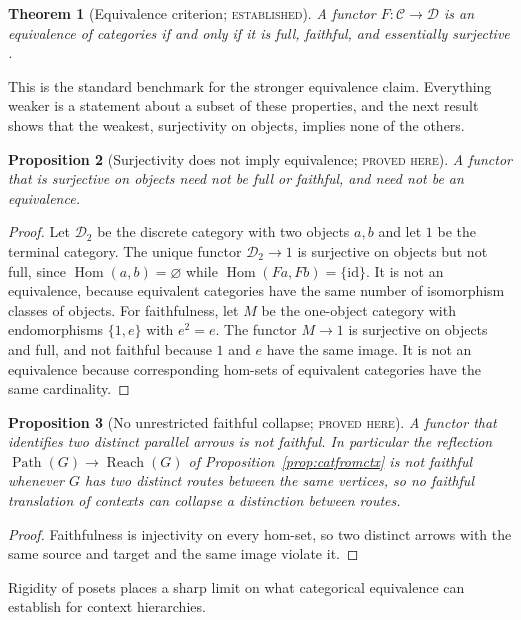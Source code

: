 \documentclass[11pt]{article}
\newtheorem{theorem}{Theorem}[section]
\newtheorem{proposition}[theorem]{Proposition}
\theoremstyle{definition}
\theoremstyle{remark}
\newcommand{\stE}{\textsc{established}}
\newcommand{\stN}{\textsc{proved here}}
\newcommand{\cC}{\mathcal C}
\newcommand{\cD}{\mathcal D}
\newcommand{\id}{\mathrm{id}}
\newcommand{\Hom}{\operatorname{Hom}}
\newcommand{\Path}{\operatorname{Path}}
\newcommand{\Reach}{\operatorname{Reach}}
\begin{document}
\begin{theorem}[Equivalence criterion; \stE]\label{thm:equiv}
A functor $F:\cC\to\cD$ is an equivalence of categories if and only if it is full, faithful, and essentially surjective \cite{maclane}.
\end{theorem}

This is the standard benchmark for the stronger equivalence claim. Everything weaker is a statement about a subset of these properties, and the next result shows that the weakest, surjectivity on objects, implies none of the others.

\begin{proposition}[Surjectivity does not imply equivalence; \stN]\label{prop:surjnotequiv}
A functor that is surjective on objects need not be full or faithful, and need not be an equivalence.
\end{proposition}
\begin{proof}
Let $\cD_2$ be the discrete category with two objects $a,b$ and let $1$ be the terminal category. The unique functor $\cD_2\to1$ is surjective on objects but not full, since $\Hom(a,b)=\varnothing$ while $\Hom(F a,Fb)=\{\id\}$. It is not an equivalence, because equivalent categories have the same number of isomorphism classes of objects. For faithfulness, let $M$ be the one-object category with endomorphisms $\{1,e\}$ with $e^2=e$. The functor $M\to1$ is surjective on objects and full, and not faithful because $1$ and $e$ have the same image. It is not an equivalence because corresponding hom-sets of equivalent categories have the same cardinality.
\end{proof}

\begin{proposition}[No unrestricted faithful collapse; \stN]\label{prop:nocollapse}
A functor that identifies two distinct parallel arrows is not faithful. In particular the reflection $\Path(G)\to\Reach(G)$ of Proposition~\ref{prop:catfromctx} is not faithful whenever $G$ has two distinct routes between the same vertices, so no faithful translation of contexts can collapse a distinction between routes.
\end{proposition}
\begin{proof}
Faithfulness is injectivity on every hom-set, so two distinct arrows with the same source and target and the same image violate it.
\end{proof}

Rigidity of posets places a sharp limit on what categorical equivalence can establish for context hierarchies.
\end{document}
